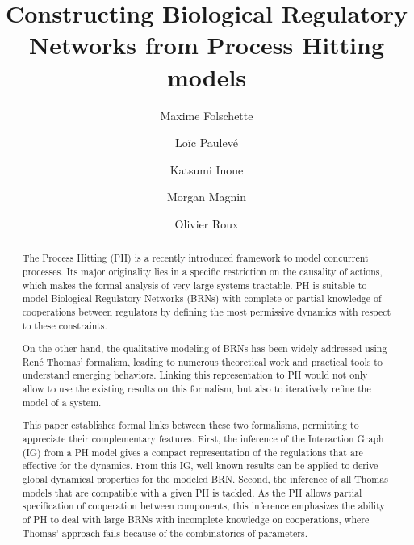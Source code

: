 \documentclass[preprint]{elsarticle}
\begin{document}
\begin{frontmatter}

\title{Constructing Biological Regulatory Networks from Process Hitting models}

\author[irccyn,nii]{Maxime Folschette}
\author[eth]{Lo\"ic Paulev\'e}
\author[nii]{Katsumi Inoue}
\author[irccyn,nii]{Morgan Magnin}
\author[irccyn]{Olivier Roux}

\address[irccyn]{LUNAM Universit\'e, \'Ecole Centrale de Nantes, IRCCyN UMR CNRS 6597\\
(Institut de Recherche en Communications et Cybern\'etique de Nantes)\\
1 rue de la No\"e - B.P. 92101 - 44321 Nantes Cedex 3, France.}
\address[nii]{National Institute of Informatics,\\
2-1-2, Hitotsubashi, Chiyoda-ku, Tokyo 101-8430, Japan.}
\address[eth]{BISON group, Automatic Control Laboratory, ETH Zürich\\
Physikstrasse 3, 8092 Zurich, Switzerland.}

\begin{abstract}
\parindent 0.5cm
The Process Hitting (PH) is a recently introduced framework to model concurrent processes.
Its major originality lies in a specific restriction on the causality of actions, which
makes the formal analysis of very large systems tractable.
PH is suitable to model Biological Regulatory Networks (BRNs) with complete or partial
knowledge of cooperations between regulators by defining the most permissive dynamics
with respect to these constraints.

On the other hand, the qualitative modeling of BRNs has been widely addressed using Ren\'e Thomas'
formalism, leading to numerous theoretical work and practical tools to understand emerging behaviors.
Linking this representation to PH would not only allow to use the existing results on this formalism,
but also to iteratively refine the model of a system.

This paper establishes formal links between these two formalisms, permitting to appreciate their
complementary features.
First, the inference of the Interaction Graph (IG) from a PH model gives a compact representation of
the regulations that are effective for the dynamics.
From this IG, well-known results can be applied to derive global dynamical properties for the
modeled BRN.
Second, the inference of all Thomas models that are compatible with a given PH is tackled.
As the PH allows partial specification of cooperation between components, this inference
emphasizes the ability of PH to deal with large BRNs with incomplete knowledge on
cooperations, where Thomas' approach fails because of the combinatorics of parameters.


\end{abstract}
\end{frontmatter}
\end{document}
